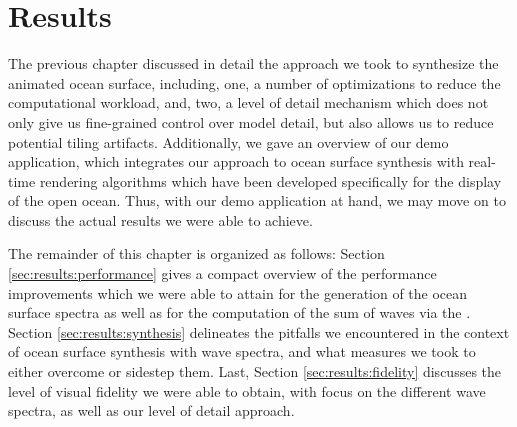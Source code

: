 \chapter{Results}
\label{ch:results}
%

The previous chapter discussed in detail the approach we took to synthesize
the animated ocean surface, including, one, a number of optimizations to reduce
the computational workload, and, two, a level of detail mechanism which does
not only give us fine-grained control over model detail, but also allows us to
reduce potential tiling artifacts. Additionally, we gave an overview of our demo
application, which integrates our approach to ocean surface synthesis
with real-time rendering algorithms which have been developed specifically for
the display of the open ocean.
Thus, with our demo application at hand, we may move on to discuss the
actual results we were able to achieve.

The remainder of this chapter is organized as follows:
Section \ref{sec:results:performance} gives a compact overview of the performance
improvements which we were able to attain for the generation of the ocean
surface spectra as well as for the computation of the sum of waves via the
\InvFourierTransform.
Section \ref{sec:results:synthesis} delineates the pitfalls we encountered
in the context of ocean surface synthesis with wave spectra, and what measures
we took to either overcome or sidestep them.
Last, Section \ref{sec:results:fidelity} discusses the level of visual fidelity
we were able to obtain, with focus on the different wave spectra, as well as
our level of detail approach.
%
